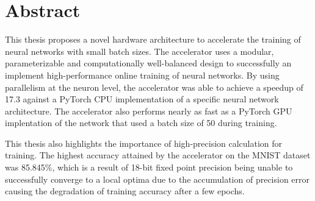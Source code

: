 \chapter{Abstract}

This thesis proposes a novel hardware architecture to accelerate the training of neural networks with small batch sizes. The accelerator uses a modular, parameterizable and computationally well-balanced design to successfully an implement high-performance online training of neural networks. By using parallelism at the neuron level, the accelerator was able to achieve a speedup of 17.3 against a PyTorch CPU implementation of a specific neural network architecture. The accelerator also performs nearly as fast as a PyTorch GPU implentation of the network that used a batch size of 50 during training.

This thesis also highlights the importance of high-precision calculation for training. The highest accuracy attained by the accelerator on the MNIST dataset was 85.845\%, which is a result of 18-bit fixed point precision being unable to successfully converge to a local optima due to the accumulation of precision error causing the degradation of training accuracy after a few epochs.

